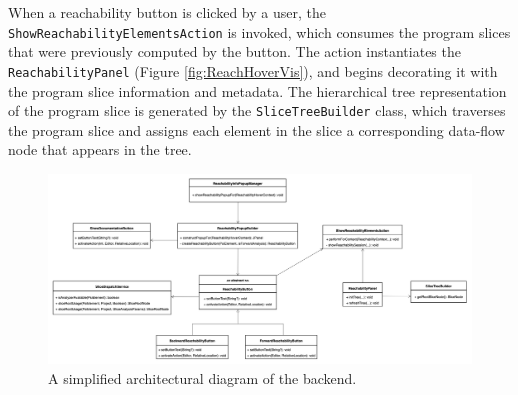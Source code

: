 \par When a reachability button is clicked by a user, the 
\texttt{ShowReachabilityElementsAction} is invoked, which consumes the program
slices that were previously computed by the button.
The action instantiates the \texttt{ReachabilityPanel}
(Figure \ref{fig:ReachHoverVis}), and begins decorating it with the program
slice information and metadata.
The hierarchical tree representation of the program slice is generated by the
\texttt{SliceTreeBuilder} class, which traverses the program slice and assigns
each element in the slice a corresponding data-flow node that appears in the
tree.

\begin{landscape}
\begin{figure}[ht]
\centering
\includegraphics[scale=0.35]{./figs/reach-hover-backend.png}
\caption{
  A simplified architectural diagram of the \toolname{} backend.
}
\label{fig:ReachHoverBackend}
\end{figure}
\end{landscape}

\endinput
